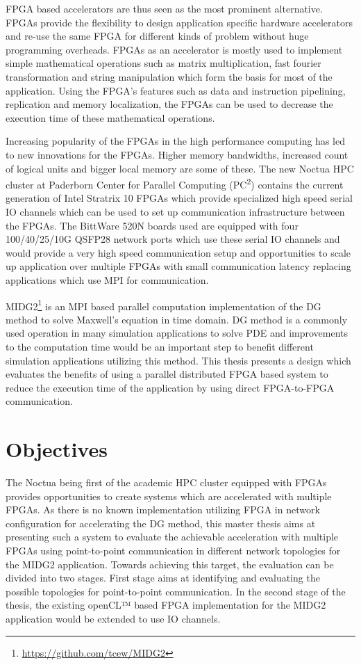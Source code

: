 FPGA based accelerators are thus seen as the most prominent alternative. FPGAs provide the flexibility
to design application specific hardware accelerators and re-use the same FPGA for different kinds
of problem without huge programming overheads. FPGAs as an accelerator is mostly used to implement
simple mathematical operations such as matrix multiplication, fast fourier transformation and
string manipulation which form the basis for most of the application. Using the FPGA's features
such as data and instruction pipelining, replication and memory localization, the FPGAs can be
used to decrease the execution time of these mathematical operations.

Increasing popularity of the FPGAs in the high performance computing has led to new innovations for
the FPGAs. Higher memory bandwidths, increased count of logical units and bigger local memory
are some of these. The new Noctua \ac{HPC} cluster at Paderborn Center for Parallel
Computing (PC\textsuperscript{2}) contains the current generation of Intel Stratrix 10 FPGAs which provide
specialized high speed serial IO channels which can be used to set up communication infrastructure
between the FPGAs. The BittWare 520N boards used are equipped with four 100/40/25/10G
QSFP28 network ports which use these serial IO channels and would provide a very high speed
communication setup and opportunities to scale up application over multiple FPGAs with small
communication latency replacing applications which use MPI for communication.

MIDG2\footnote{\url{https://github.com/tcew/MIDG2}} is an MPI based parallel computation
implementation of the \ac{DG} \cite{hesthaven_nodal_2008} method to solve Maxwell’s equation
in time domain. \ac{DG} method is a commonly used operation in many simulation applications to
solve \ac{PDE} and improvements to the computation time would be an important step to
benefit different simulation applications utilizing this method. This thesis presents
a design which evaluates the benefits of using a parallel distributed FPGA based system
to reduce the execution time of the application by using direct FPGA-to-FPGA communication.

\section{Objectives}

The Noctua being first of the academic \ac{HPC} cluster equipped with FPGAs provides
opportunities to create systems which are accelerated with multiple FPGAs. As there is
no known implementation utilizing FPGA in network configuration for accelerating the
DG method, this master thesis aims at presenting such a system to evaluate
the achievable acceleration with multiple FPGAs using point-to-point communication in
different network topologies for the MIDG2 application. Towards achieving this target,
the evaluation can be divided into two stages. First stage aims at identifying
and evaluating the possible topologies for point-to-point communication. In the second
stage of the thesis, the existing openCL™ based FPGA implementation for
the MIDG2 application would be extended to use IO channels.

